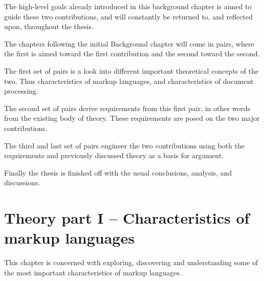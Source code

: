 \documentclass{scrreprt}
\begin{document}
The high-level goals already introduced in this background chapter is aimed to guide these two contributions, and will constantly be returned to, and reflected upon, throughout the thesis.

The chapters following the initial Background chapter will come in pairs, where the first is aimed toward the first contribution and the second toward the second.

The first set of pairs is a look into different important theoretical concepts of the two. Thus characteristics of markup languages, and characteristics of document processing.

The second set of pairs derive requirements from this first pair, in other words from the existing body of theory. These requirements are posed on the two major contributions.

The third and last set of pairs engineer the two contributions using both the requirements and previously discussed theory as a basis for argument.

Finally the thesis is finished off with the usual conclusions, analysis, and discussions.


























%
%
%
%
%
%


\chapter{Theory part I -- Characteristics of markup languages}
\label{sec:theory}
This chapter is concerned with exploring, discovering and understanding some of the most important characteristics of markup languages.
\end{document}
